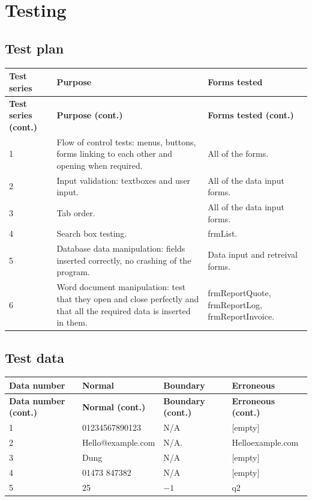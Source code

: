 \chapter{Testing}

\section{Test plan}
\begin{longtable}{ | p{4cm} | p{4cm} | p{4cm} | }
	\hline
	\textbf{Test series} & \textbf{Purpose} & \textbf{Forms tested}\\
	\endfirsthead
	\hline
	\textbf{Test series (cont.)} & \textbf{Purpose (cont.)} & \textbf{Forms tested (cont.)}\\
	\endhead
	\hline
	1 &  Flow of control tests: menus, buttons, forms linking to each other and opening when required. & All of the forms.\\
	\hline
	2 & Input validation: textboxes and user input. & All of the data input forms.\\
	\hline
	3 & Tab order. & All of the data input forms.\\
	\hline
	4 & Search box testing. & frmList.\\
	\hline
	5 & Database data manipulation: fields inserted correctly, no crashing of the program. & Data input and retreival forms.\\
	\hline
	6 & Word document manipulation: test that they open and close perfectly and that all the required data is inserted in them. & frmReportQuote, frmReportLog, frmReportInvoice.\\
	\hline
\end{longtable}

\section{Test data}
\begin{longtable}{ | p{4cm} | p{4cm} | p{4cm} | p{4cm} | }
	\hline
	\textbf{Data number} & \textbf{Normal} & \textbf{Boundary} & \textbf{Erroneous}\\
	\endfirsthead
	\textbf{Data number (cont.)} & \textbf{Normal (cont.)} & \textbf{Boundary (cont.)} & \textbf{Erroneous (cont.)}\\
	\endhead
	\hline
	1 & 01234567890123 & N\slash A & [empty]\\
	\hline
	2 & Hello@example.com & N\slash A. & Helloexample.com\\
	\hline
	3 & Dung & N\slash A & [empty]\\ %
	\hline
	4 & 01473 847382 & N\slash A & [empty]\\
	\hline
	5 & 25 & $-1$ & q2\\
	\hline
\end{longtable}


